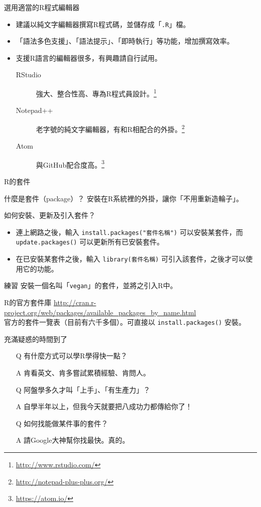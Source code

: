 \documentclass[12pt]{beamer}
\let\oldfootnote\footnote
\renewcommand\footnote[1]{\hspace{-0.6em}\oldfootnote{\scriptsize\ignorespaces#1}\hspace{0.6em}}
\begin{document}
\begin{frame}[fragile]{選用適當的R程式編輯器}
\begin{itemize}
\item 建議以純文字編輯器撰寫R程式碼，並儲存成「\verb+.R+」檔。
\item 「語法多色支援」、「語法提示」、「即時執行」等功能，增加撰寫效率。
\item 支援R語言的編輯器很多，有興趣請自行試用。
\begin{description}
	\item [RStudio] 強大、整合性高、專為R程式員設計。\footnote{\url{http://www.rstudio.com/}}
	\item [Notepad++] 老字號的純文字編輯器，有和R相配合的外掛。\footnote{\url{http://notepad-plus-plus.org/}}
	\item [Atom] 與GitHub配合度高。\footnote{\url{https://atom.io/}}
\end{description}
\end{itemize}
\end{frame}


\begin{frame}[fragile]{R的套件}
\begin{block}{什麼是套件（package）？}
安裝在R系統裡的外掛，讓你「不用重新造輪子」。
\end{block}

如何安裝、更新及引入套件？
\begin{itemize}
\item 連上網路之後，輸入
\verb+install.packages("套件名稱")+
可以安裝某套件，而
\verb+update.packages()+
可以更新所有已安裝套件。
\item 在已安裝某套件之後，輸入
\verb+library(套件名稱)+
可引入該套件，之後才可以使用它的功能。
\end{itemize}

\begin{block}{練習}
安裝一個名叫「\verb+vegan+」的套件，並將之引入R中。
\end{block}
\end{frame}

\begin{frame}[fragile]{R的官方套件庫}
\url{http://cran.r-project.org/web/packages/available_packages_by_name.html}\\
官方的套件一覽表（目前有六千多個）。可直接以 \verb+install.packages()+ 安裝。
\end{frame}


\begin{frame}[fragile]{充滿疑惑的時間到了}
\begin{itemize}
\item[Q] 有什麼方式可以學R學得快一點？
\item[A] 肯看英文、肯多嘗試累積經驗、肯問人。
\item [ ] \pause
\item[Q] 阿盤學多久才叫「上手」、「有生產力」？
\item[A] 自學半年以上，但我今天就要把八成功力都傳給你了！
\item [ ] \pause
\item[Q] 如何找能做某件事的套件？
\item[A] 請Google大神幫你找最快。真的。
\end{itemize}
\end{frame}
\end{document}
